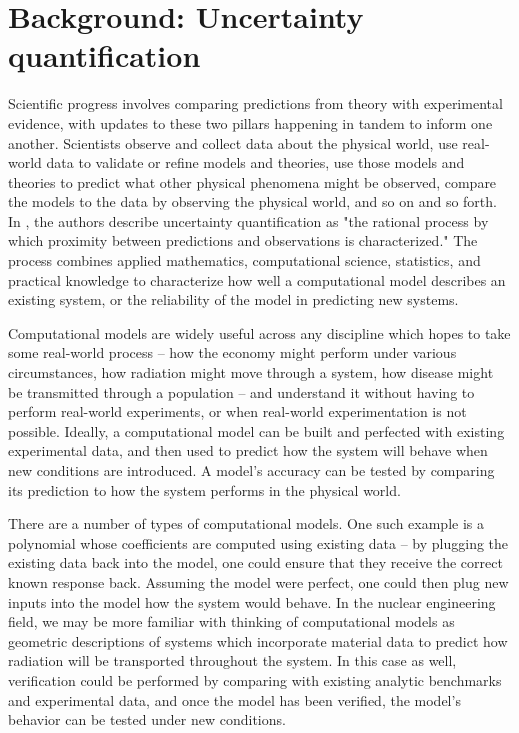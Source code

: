 \section{Background: Uncertainty quantification}\label{sec:background-uq}
Scientific progress involves comparing predictions from theory with experimental evidence, with updates to these two pillars happening in tandem to inform one another. Scientists observe and collect data about the physical world, use real-world data to validate or refine models and theories, use those models and theories to predict what other physical phenomena might be observed, compare the models to the data by observing the physical world, and so on and so forth. In \cite{ghanem-uq-handbook}, the authors describe uncertainty quantification as "the rational process by which proximity between predictions and observations is characterized." The process combines applied mathematics, computational science, statistics, and practical knowledge to characterize how well a computational model describes an existing system, or the reliability of the model in predicting new systems.


Computational models are widely useful across any discipline which hopes to take some real-world process -- how the economy might perform under various circumstances, how radiation might move through a system, how disease might be transmitted through a population -- and understand it without having to perform real-world experiments, or when real-world experimentation is not possible. Ideally, a computational model can be built and perfected with existing experimental data, and then used to predict how the system will behave when new conditions are introduced. A model's accuracy can be tested by comparing its prediction to how the system performs in the physical world.

There are a number of types of computational models. One such example is a polynomial whose coefficients are computed using existing data -- by plugging the existing data back into the model, one could ensure that they receive the correct known response back. Assuming the model were perfect, one could then plug new inputs into the model how the system would behave. In the nuclear engineering field, we may be more familiar with thinking of computational models as geometric descriptions of systems which incorporate material data to predict how radiation will be transported throughout the system. In this case as well, verification could be performed by comparing with existing analytic benchmarks and experimental data, and once the model has been verified, the model's behavior can be tested under new conditions.

